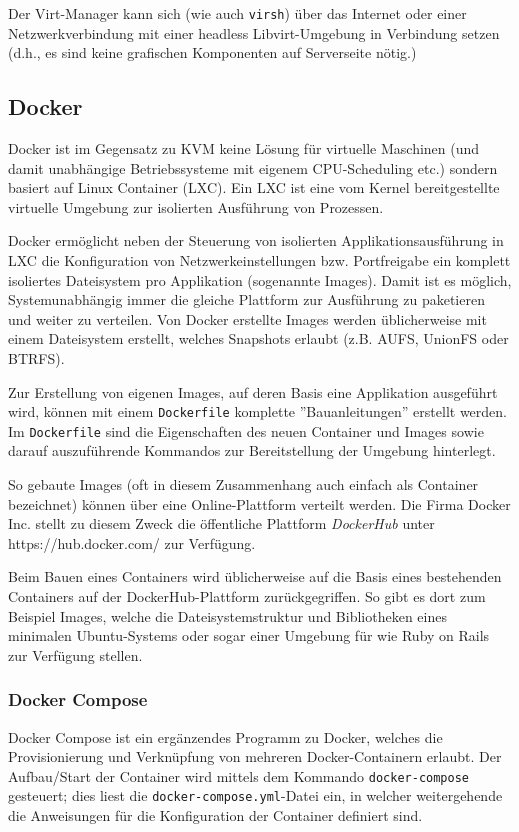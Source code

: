 Der Virt-Manager kann sich (wie auch \lstinline|virsh|) über das Internet oder einer Netzwerkverbindung mit einer headless Libvirt-Umgebung in Verbindung setzen (d.h., es sind keine grafischen Komponenten auf Serverseite nötig.)

\subsection{Docker}
Docker ist im Gegensatz zu KVM keine Lösung für virtuelle Maschinen (und damit unabhängige Betriebssysteme mit eigenem CPU-Scheduling etc.) sondern basiert auf Linux Container (LXC). Ein LXC ist eine vom Kernel bereitgestellte virtuelle Umgebung zur isolierten Ausführung von Prozessen.

Docker ermöglicht neben der Steuerung von isolierten Applikationsausführung in LXC die Konfiguration von Netzwerkeinstellungen bzw. Portfreigabe ein komplett isoliertes Dateisystem pro Applikation (sogenannte Images). Damit ist es möglich, Systemunabhängig immer die gleiche Plattform zur Ausführung zu paketieren und weiter zu verteilen. Von Docker erstellte Images werden üblicherweise mit einem Dateisystem erstellt, welches Snapshots erlaubt (z.B. AUFS, UnionFS oder BTRFS).

Zur Erstellung von eigenen Images, auf deren Basis eine Applikation ausgeführt wird, können mit einem \lstinline[]|Dockerfile| komplette ''Bauanleitungen'' erstellt werden. Im \lstinline[]|Dockerfile| sind die Eigenschaften des neuen Container und Images sowie darauf auszuführende Kommandos zur Bereitstellung der Umgebung hinterlegt.

So gebaute Images (oft in diesem Zusammenhang auch einfach als Container bezeichnet) können über eine Online-Plattform verteilt werden. Die Firma Docker Inc. stellt zu diesem Zweck die öffentliche Plattform \emph{DockerHub} unter https://hub.docker.com/ zur Verfügung.

Beim Bauen eines Containers wird üblicherweise auf die Basis eines bestehenden Containers auf der DockerHub-Plattform zurückgegriffen. So gibt es dort zum Beispiel Images, welche die Dateisystemstruktur und Bibliotheken eines minimalen Ubuntu-Systems oder sogar einer Umgebung für  wie Ruby on Rails zur Verfügung stellen.

\subsubsection{Docker Compose}

Docker Compose ist ein ergänzendes Programm zu Docker, welches die Provisionierung und Verknüpfung von mehreren Docker-Containern erlaubt. Der Aufbau/Start der Container wird mittels dem Kommando \lstinline|docker-compose| gesteuert; dies liest die \lstinline|docker-compose.yml|-Datei ein, in welcher weitergehende die Anweisungen für die Konfiguration der Container definiert sind.

